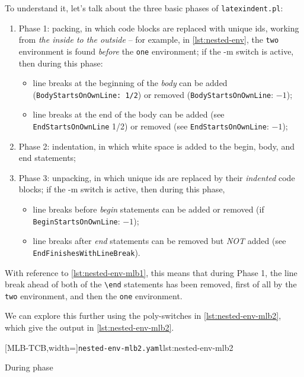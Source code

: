     To understand it, let's talk about the three basic phases of \texttt{latexindent.pl}:
	\begin{enumerate}
      \item Phase 1: packing, in which code blocks are replaced with unique ids, working from \emph{the inside to the outside} -- for example, in 
        \cref{lst:nested-env}, the \texttt{two} environment is found \emph{before} the \texttt{one} environment; if the -m switch is active, then during this phase:
		      \begin{itemize}
                \item line breaks at the beginning of the \emph{body} can be added (\texttt{BodyStartsOnOwnLine: 1/2}) or removed (\texttt{BodyStartsOnOwnLine}: $-1$);
                \item line breaks at the end of the body can be added (see \texttt{EndStartsOnOwnLine} 1/2) or removed (see \texttt{EndStartsOnOwnLine}: $-1$);
		      \end{itemize}
		\item Phase 2: indentation, in which white space is added to the begin, body, and end statements;
		\item Phase 3: unpacking, in which unique ids are replaced by their \emph{indented} code blocks; if the -m switch is active, then during this phase,
		      \begin{itemize}
                \item line breaks before \emph{begin} statements can be added or removed (if \texttt{BeginStartsOnOwnLine}: $-1$);
                \item line breaks after \emph{end} statements can be removed but \emph{NOT} added (see \texttt{EndFinishesWithLineBreak}).
		      \end{itemize}
	\end{enumerate}

    With reference to \cref{lst:nested-env-mlb1}, this means that during Phase 1, the line break ahead of both of the \lstinline!\end! statements has been 
    removed, first of all by the \texttt{two} environment, and then the \texttt{one} environment.

    We can explore this further using the poly-switches in \cref{lst:nested-env-mlb2}, which give the output in \cref{lst:nested-env-mlb2}.

	\begin{minipage}{.45\linewidth}
	\end{minipage}
    \hfill
	\begin{minipage}{.55\linewidth}
		[MLB-TCB,width=\linewidth]{\texttt{nested-env-mlb2.yaml}}{lst:nested-env-mlb2}
	\end{minipage}

    During phase 
